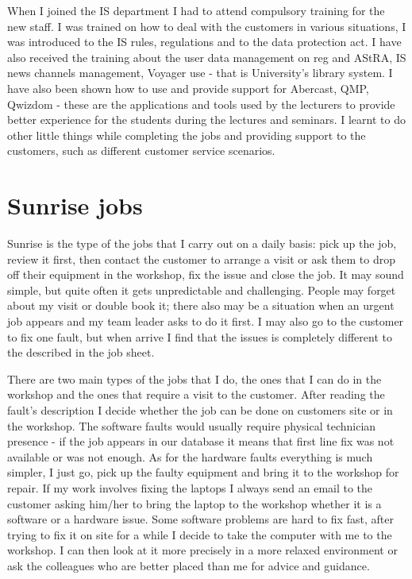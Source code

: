 \documentclass[10pt,a4paper,headinclude=true]{report}
\begin{document}
When I joined the IS department I had to attend compulsory training for the new staff. I was trained on how to deal with the customers in various situations, I was introduced to the IS rules, regulations and to the data protection act. I have also received the training about the user data management on reg and AStRA, IS news channels management, Voyager use - that is University's library system. I have also been shown how to use and provide support for Abercast, QMP, Qwizdom - these are the applications and tools used by the lecturers to provide better experience for the students during the lectures and seminars. I learnt to do other little things while completing the jobs and providing support to the customers, such as different customer service scenarios.

\section{Sunrise jobs}
Sunrise is the type of the jobs that I carry out on a daily basis: pick up the job, review it first, then contact the customer to arrange a visit or ask them to drop off their equipment in the workshop, fix the issue and close the job. It may sound simple, but quite often it gets unpredictable and challenging. People may forget about my visit or double book it; there also may be a situation when an urgent job appears and my team leader asks to do it first. I may also go to the customer to fix one fault, but when arrive I find that the issues is completely different to the described in the job sheet.

There are two main types of the jobs that I do, the ones that I can do in the workshop and the ones that require a visit to the customer. After reading the fault's description I decide whether the job can be done on customers site or in the workshop. The software faults would usually require physical technician presence - if the job appears in our database it means that first line fix was not available or was not enough. As for the hardware faults everything is much simpler, I just go, pick up the faulty equipment and bring it to the workshop for repair. If my work involves fixing the laptops I always send an email to the customer asking him/her to bring the laptop to the workshop whether it is a software or a hardware issue. Some software problems are hard to fix fast, after trying to fix it on site for a while I decide to take the computer with me to the workshop. I can then look at it more precisely in a more relaxed environment or ask the colleagues who are better placed than me for advice and guidance.
\end{document}
